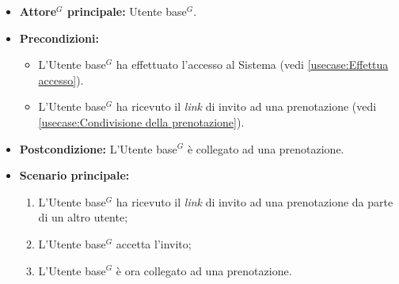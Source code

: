 \label{usecase:Accesso alla prenotazione}
\begin{itemize}
	\item \textbf{\gls{Attore}$^G$ principale:} \gls{Utente base}$^G$.

	\item \textbf{Precondizioni:} 
	\begin{itemize}
		\item L'\gls{Utente base}$^G$ ha effettuato l'accesso al Sistema (vedi \autoref{usecase:Effettua accesso}).
		\item L'\gls{Utente base}$^G$ ha ricevuto il \textit{link} di invito ad una prenotazione (vedi \autoref{usecase:Condivisione della prenotazione}).
	\end{itemize}
		

	\item \textbf{Postcondizione:} L'\gls{Utente base}$^G$ è collegato ad una prenotazione.

	\item \textbf{Scenario principale:}
	      \begin{enumerate}
		      \item L'\gls{Utente base}$^G$ ha ricevuto il \textit{link} di invito ad una prenotazione da parte di un altro utente;
		      \item L'\gls{Utente base}$^G$ accetta l'invito;
		      \item L'\gls{Utente base}$^G$ è ora collegato ad una prenotazione.
	      \end{enumerate}
\end{itemize}
